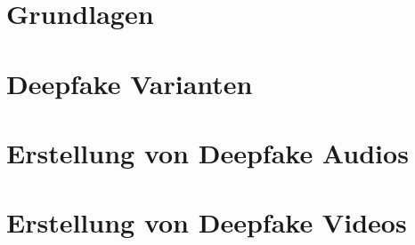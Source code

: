 % 
\chapter{Grundlagen}\label{ch:grundlagen}




\chapter{Deepfake Varianten}\label{ch:deepfake-varianten}



\chapter{Erstellung von Deepfake Audios}\label{ch:erstellung-von-deepfake-audios}


\chapter{Erstellung von Deepfake Videos}\label{ch:erstellung-von-deepfake-videos}




